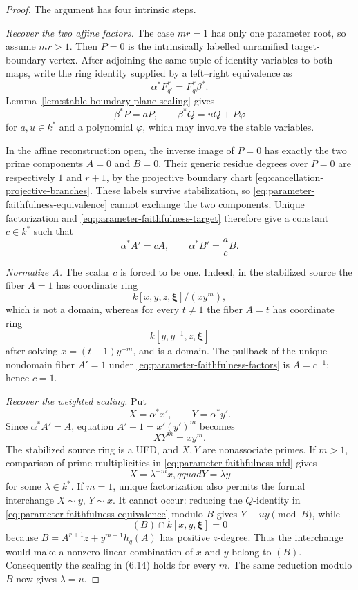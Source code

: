 \begin{proof}
The argument has four intrinsic steps.

\smallskip
\noindent\emph{Recover the two affine factors.}
The case $mr=1$ has only one parameter root, so assume $mr>1$.  Then $P=0$
is the intrinsically labelled unramified target-boundary vertex.  After
adjoining the same tuple of identity variables to both maps, write the ring
identity supplied by a left--right equivalence as
\[
 \alpha^*F_{q'}^*=F_q^*\beta^*.                       \tag{6.8}
 \label{eq:parameter-faithfulness-equivalence}
\]
Lemma~\ref{lem:stable-boundary-plane-scaling} gives
\[
 \beta^*P=aP,
 \qquad
 \beta^*Q=uQ+P\varphi                                 \tag{6.9}
 \label{eq:parameter-faithfulness-target}
\]
for $a,u\in k^*$ and a polynomial $\varphi$, which may involve the stable
variables.

In the affine reconstruction open, the inverse image of $P=0$ has exactly
the two prime components $A=0$ and $B=0$.  Their generic residue degrees over
$P=0$ are respectively $1$ and $r+1$, by the projective boundary chart
\eqref{eq:cancellation-projective-branches}.  These labels survive
stabilization, so \eqref{eq:parameter-faithfulness-equivalence} cannot
exchange the two components.  Unique factorization and
\eqref{eq:parameter-faithfulness-target} therefore give a constant
$c\in k^*$ such that
\[
 \alpha^*A'=cA,
 \qquad
 \alpha^*B'=\frac acB.                                \tag{6.10}
 \label{eq:parameter-faithfulness-factors}
\]

\smallskip
\noindent\emph{Normalize $A$.}
The scalar $c$ is forced to be one.  Indeed, in the stabilized source the
fiber $A=1$ has coordinate ring
\[
 k[x,y,z,\boldsymbol\xi]/(xy^m),                       \tag{6.11}
\]
which is not a domain, whereas for every $t\ne1$ the fiber $A=t$ has
coordinate ring
\[
 k[y,y^{-1},z,\boldsymbol\xi]                          \tag{6.12}
\]
after solving $x=(t-1)y^{-m}$, and is a domain.  The pullback of the unique
nondomain fiber $A'=1$ under
\eqref{eq:parameter-faithfulness-factors} is $A=c^{-1}$; hence $c=1$.

\smallskip
\noindent\emph{Recover the weighted scaling.}
Put
\[
 X=\alpha^*x',\qquad Y=\alpha^*y'.
\]
Since $\alpha^*A'=A$, equation $A'-1=x'(y')^m$ becomes
\[
 XY^m=xy^m.                                             \tag{6.13}
 \label{eq:parameter-faithfulness-ufd}
\]
The stabilized source ring is a UFD, and $X,Y$ are nonassociate primes.
If $m>1$, comparison of prime multiplicities in
\eqref{eq:parameter-faithfulness-ufd} gives
\[
 X=\lambda^{-m}x,qquad Y=\lambda y                   \tag{6.14}
\]
for some $\lambda\in k^*$.  If $m=1$, unique factorization also permits the
formal interchange $X\sim y$, $Y\sim x$.  It cannot occur: reducing the
$Q$-identity in \eqref{eq:parameter-faithfulness-equivalence} modulo $B$
gives $Y\equiv uy\pmod B$, while
\[
 (B)\cap k[x,y,\boldsymbol\xi]=0                       \tag{6.15}
\]
because $B=A^{r+1}z+y^{m+1}h_q(A)$ has positive $z$-degree.  Thus the
interchange would make a nonzero linear combination of $x$ and $y$ belong to
$(B)$.  Consequently the scaling in (6.14) holds for every $m$.  The same
reduction modulo $B$ now gives $\lambda=u$.


\end{proof}
